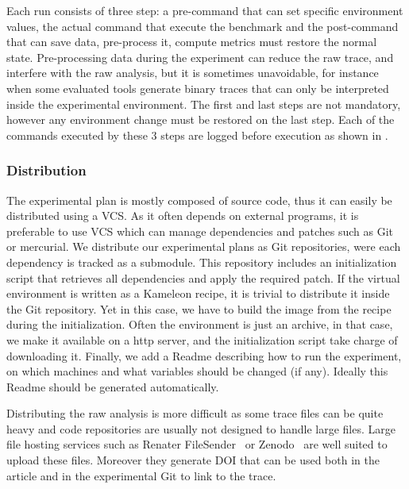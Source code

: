 Each run consists of three step: a pre-command that can set specific environment values, the actual command that execute the benchmark and the post-command that can save data, pre-process it, compute metrics must restore the normal state.
Pre-processing data during the experiment can reduce the raw trace, and interfere with the raw analysis, but it is sometimes unavoidable, for instance when some evaluated tools generate binary traces that can only be interpreted inside the experimental environment.
The first and last steps are not mandatory, however any environment change must be restored on the last step.
Each of the commands executed by these 3 steps are logged before execution as shown in .



\subsubsection{Distribution}

The experimental plan is mostly composed of source code, thus it can easily be distributed using a \gls{VCS}.
As it often depends on external programs, it is preferable to use \gls{VCS} which can manage dependencies and patches such as \gls{Git} or mercurial.
We distribute our experimental plans as \gls{Git} repositories, were each dependency is tracked as a submodule.
This repository includes an initialization script that retrieves all dependencies and apply the required patch.
If the virtual environment is written as a \gls{Kameleon} recipe, it is trivial to distribute it inside the \gls{Git} repository.
Yet in this case, we have to build the image from the recipe during the initialization.
Often the environment is just an archive, in that case, we make it available on a http server, and the initialization script take charge of downloading it.
Finally, we add a Readme describing how to run the experiment, on which machines and what variables should be changed (if any).
Ideally this Readme should be generated automatically.

Distributing the raw analysis is more difficult as some trace files can be quite heavy and code repositories are usually not designed to handle large files.
Large file hosting services such as Renater FileSender~\cite{RenaterFileSender} or Zenodo~\cite{CernZenodo} are well suited to upload these files.
Moreover they generate \gls{DOI} that can be used both in the article and in the experimental \gls{Git} to link to the trace.

